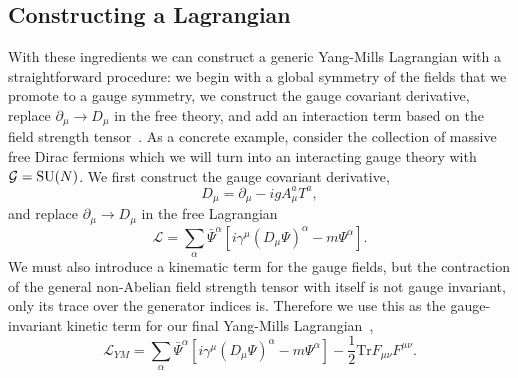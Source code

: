 \subsection{Constructing a Lagrangian}
With these ingredients we can construct a generic Yang-Mills Lagrangian with a straightforward procedure: we begin with a global symmetry of the fields that we promote to a gauge symmetry, we construct the gauge covariant derivative, replace $\partial_{\mu} \rightarrow D_{\mu}$ in the free theory, and add an interaction term based on the field strength tensor~\cite{PeskinSchroeder}. 
As a concrete example, consider the collection of massive free Dirac fermions which we will turn into an interacting gauge theory with $\mathcal{G} = {\mathrm{SU}(N)}$.
We first construct the gauge covariant derivative, 
\begin{equation}
    \label{eq:theory:generic_SUN_Dmu}
    D_{\mu} = \partial_{\mu} - igA_{\mu}^{a} T^{a},
\end{equation}
and replace $\partial_{\mu} \rightarrow D_{\mu}$ in the free Lagrangian
\begin{equation}
    \label{eq:theory:int_dirac_no_gauge_dynamics}
    \mathcal{L} = \sum_{\alpha} \bar{\Psi}^{\alpha}[i\gamma^{\mu}(D_{\mu}\Psi)^{\alpha} - m\Psi^{\alpha}].
\end{equation}
We must also introduce a kinematic term for the gauge fields, but the contraction of the general non-Abelian field strength tensor with itself is not gauge invariant, only its trace over the generator indices is. 
Therefore we use this as the gauge-invariant kinetic term for our final Yang-Mills Lagrangian~\cite{PeskinSchroeder},
\begin{equation}
    \label{eq:theory:int_dirac_gauge_dynamics}
    \mathcal{L}_{YM} = \sum_{\alpha} \bar{\Psi}^{\alpha}[i\gamma^{\mu}(D_{\mu}\Psi)^{\alpha} - m\Psi^{\alpha}] - \frac{1}{2}\mathrm{Tr}F_{\mu\nu}F^{\mu\nu}.
\end{equation}
%
%

